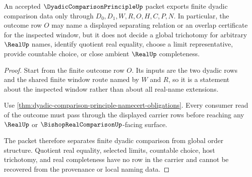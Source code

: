 \begin{theorem}
\label{thm:dyadic-comparison-principle-trichotomy-refusal}
An accepted $\DyadicComparisonPrincipleUp$ packet exports finite dyadic comparison data only through $D_0,D_1,W,R,O,H,C,P,N$. In particular, the outcome row $O$ may name a displayed separating relation or an overlap certificate for the inspected window, but it does not decide a global trichotomy for arbitrary $\RealUp$ names, identify quotient real equality, choose a limit representative, provide countable choice, or close ambient $\RealUp$ completeness.
\end{theorem}
\begin{proof}
Start from the finite outcome row $O$. Its inputs are the two dyadic rows and the shared finite window route named by $W$ and $R$, so it is a statement about the inspected window rather than about all real-name extensions.

Use \autoref{thm:dyadic-comparison-principle-namecert-obligations}. Every consumer read of the outcome must pass through the displayed carrier rows before reaching any $\RealUp$ or $\BishopRealComparisonUp$-facing surface.

The packet therefore separates finite dyadic comparison from global order structure. Quotient real equality, selected limits, countable choice, host trichotomy, and real completeness have no row in the carrier and cannot be recovered from the provenance or local naming data.
\end{proof}


\begin{closurestatus}{\DyadicComparisonPrincipleUp}
  \theoryclosure{\seedClosure}
  \formalstatus{\unformalizedV}
\end{closurestatus}
